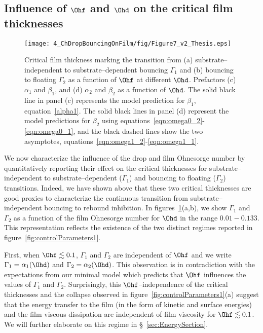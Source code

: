 \subsection{Influence of $\Ohf$ and $\Ohd$ on the critical film thicknesses}
\begin{figure}
	\centering
	\texttt{[image: 4\_ChDropBouncingOnFilm/fig/Figure7\_v2\_Thesis.eps]}
	\caption{Critical film thickness marking the transition from (a)  substrate--independent to substrate--dependent bouncing $\Gamma_1$ and (b) bouncing to floating $\Gamma_2$ as a function of $\Ohf$ at different $\Ohd$. Prefactors (c) $\alpha_{1}$ and $\beta_{1}$, and (d) $\alpha_{2}$ and $\beta_{2}$ as a function of $\Ohd$. The solid black line in panel (c) represents the model prediction for $\beta_1$, equation~\eqref{alpha1}. The solid black lines in panel (d) represent the model predictions for $\beta_2$ using equations~\eqref{eqn:omega0_2}-\eqref{eqn:omega0_1}, and the black dashed lines show the two asymptotes, equations~\eqref{eqn:omega1_2}-\eqref{eqn:omega1_1}.}
	\label{fig:Gamma1Gamma2}
\end{figure}

We now characterize the influence of the drop and film Ohnesorge number by quantitatively reporting their effect on the critical thicknesses for substrate--independent to substrate--dependent ($\Gamma_1$) and bouncing to floating ($\Gamma_2$) transitions. Indeed, we have shown above that these two critical thicknesses are good proxies to characterize the continuous transition from substrate--independent bouncing to rebound inhibition. In figures~\ref{fig:Gamma1Gamma2}(a,b), we show $\Gamma_1$ and $\Gamma_2$ as a function of the film Ohnesorge number for $\Ohd$ in the range $0.01 - 0.133$. This representation reflects the existence of the two distinct regimes reported in figure~\ref{fig:controlParameters1}. 

First, when $\Ohf \lesssim 0.1$, $\Gamma_1$ and $\Gamma_2$ are independent of $\Ohf$ and we write $\Gamma_1 = \alpha_1(\Ohd)$ and $\Gamma_2 = \alpha_2(\Ohd)$. This observation is in contradiction with the expectations from our minimal model which predicts that $\Ohf$ influences the values of $\Gamma_1$ and $\Gamma_2$. Surprisingly, this $\Ohf$--independence of the critical thicknesses and the collapse observed in figure~\ref{fig:controlParameters1}(a) suggest that the energy transfer to the film (in the form of kinetic and surface energies) and the film viscous dissipation are independent of film viscosity for $\Ohf \lesssim 0.1$. We will further elaborate on this regime in \S~\ref{sec:EnergySection}. 


